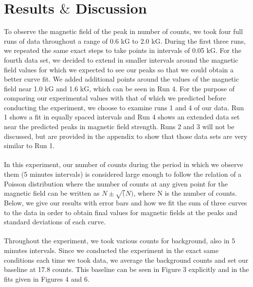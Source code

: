 \section{Results $\&$ Discussion}
To observe the magnetic field of the peak in number of counts, we took four full runs of data throughout a range of 0.6 kG to 2.0 kG. During the first three runs, we repeated the same exact steps to take points in intervals of 0.05 kG. For the fourth data set, we decided to extend in smaller intervals around the magnetic field values for which we expected to see our peaks so that we could obtain a better curve fit. We added additional points around the values of the magnetic field near 1.0 kG and 1.6 kG, which can be seen in Run 4. For the purpose of comparing our experimental values with that of which we predicted before conducting the experiment, we choose to examine runs 1 and 4 of our data. Run 1 shows a fit in equally spaced intervals and Run 4 shows an extended data set near the predicted peaks in magnetic field strength. Runs 2 and 3 will not be discussed, but are provided in the appendix to show that those data sets are very similar to Run 1. \\
\\
In this experiment, our number of counts during the period in which we observe them (5 minutes intervals) is considered large enough to follow the relation of a Poisson distribution where the number of counts at any given point for the magnetic field can be written as $N\pm \sqrt(N)$, where N is the number of counts. Below, we give our results with error bars and how we fit the sum of three curves to the data in order to obtain final values for magnetic fields at the peaks and standard deviations of each curve. \\
\\
Throughout the experiment, we took various counts for background, also in 5 minutes intervals. Since we conducted the experiment in the exact same conditions each time we took data, we average the background counts and set our baseline at 17.8 counts. This baseline can be seen in Figure 3 explicitly and in the fits given in Figures 4 and 6. 
